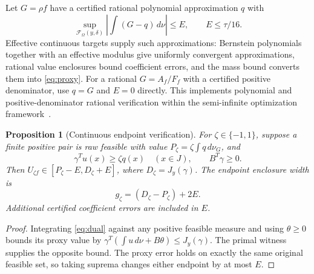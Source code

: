 \documentclass[10pt]{amsart}
\newtheorem{proposition}[theorem]{Proposition}
\theoremstyle{definition}
\theoremstyle{remark}
\theoremstyle{plain}
\newcommand{\dd}{\,d}
\newcommand{\F}{\mathcal F}
\begin{document}
Let $G=\rho f$ have a certified rational polynomial approximation $q$ with
\begin{equation}\label{eq:proxy}
 \sup_{\F_\Omega(y,\delta)}\left|\int(G-q)\dd\nu\right|\le E,
 \qquad E\le\tau/16.
\end{equation}
Effective continuous targets supply such approximations: Bernstein polynomials together with an effective modulus give uniformly convergent approximations, rational value enclosures bound coefficient errors, and the mass bound converts them into \eqref{eq:proxy}. For a rational $G=A_f/F_f$ with a certified positive denominator, use $q=G$ and $E=0$ directly. This implements polynomial and positive-denominator rational verification within the semi-infinite optimization framework~\cite{papp}.

\begin{proposition}[Continuous endpoint verification]\label{prop:verify}
For $\zeta\in\{-1,1\}$, suppose a finite positive pair is raw feasible with value $P_\zeta=\zeta\int q\dd\nu_G$, and
\begin{equation}\label{eq:dual}
 \gamma^Tu(x)\ge\zeta q(x)\quad(x\in J),\qquad B^T\gamma\ge0.
\end{equation}
Then $U_{\zeta f}\in[P_\zeta-E,D_\zeta+E]$, where $D_\zeta=J_y(\gamma)$. The endpoint enclosure width is
\begin{equation}\label{eq:gaps}
 g_\zeta=(D_\zeta-P_\zeta)+2E.
\end{equation}
Additional certified coefficient errors are included in $E$.
\end{proposition}
\begin{proof}
Integrating \eqref{eq:dual} against any positive feasible measure and using $\theta\ge0$ bounds its proxy value by $\gamma^T(\int u\dd\nu+B\theta)\le J_y(\gamma)$. The primal witness supplies the opposite bound. The proxy error holds on exactly the same original feasible set, so taking suprema changes either endpoint by at most $E$.
\end{proof}
\end{document}
